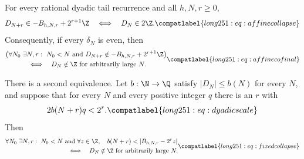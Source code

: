 \begin{theorem}\label{long251:res:affinecollapse}
For every rational dyadic tail recurrence and all $h,N,r\ge0$,
\begin{equation}
 D_{N+r}\in-B_{h,N,r}+2^{r+1}\Z\quad\Longleftrightarrow\quad D_N\in2\Z.
\label{eq:affinecollapse}\compatlabel{long251:eq:affinecollapse}
\end{equation}
Consequently, if every $\delta_N$ is even, then
\begin{equation}
 \begin{split}
 &\bigl(\forall N_0\ \exists N,r:\ N_0<N\text{ and }
 D_{N+r}\notin-B_{h,N,r}+2^{r+1}\Z\bigr)\\
 &\hspace{12mm}\Longleftrightarrow\quad
 D_N\notin\Z\text{ for arbitrarily large }N.
 \end{split}
\label{eq:affinecofinal}\compatlabel{long251:eq:affinecofinal}
\end{equation}

There is a second equivalence.  Let $b:\N\to\Q$ satisfy
$|D_N|\le b(N)$ for every $N$, and suppose that for every $N$ and every
positive integer $q$ there is an $r$ with
\begin{equation}
 2b(N+r)q<2^r.
\label{eq:dyadicscale}\compatlabel{long251:eq:dyadicscale}
\end{equation}
Then
\begin{equation}
 \begin{split}
 &\forall N_0\ \exists N,r:\ N_0<N\text{ and }
   \forall z\in\Z,\quad
   b(N+r)<|B_{h,N,r}-2^rz|\\
 &\hspace{35mm}\Longleftrightarrow\quad
 D_N\notin\Z\text{ for arbitrarily large }N.
 \end{split}
\label{eq:fixedcollapse}\compatlabel{long251:eq:fixedcollapse}
\end{equation}
\end{theorem}

